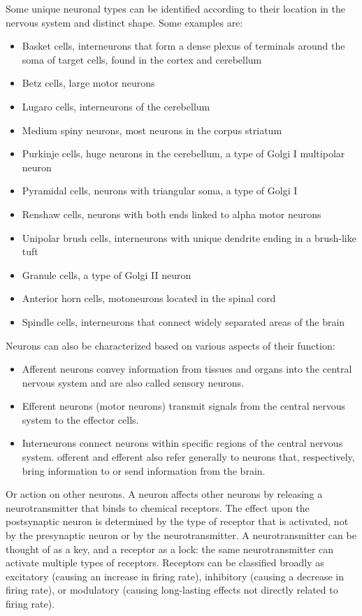 Some unique neuronal types can be identified according to their location in the nervous system and distinct shape. Some examples are:

\begin{itemize}
\tightlist
\item
  Basket cells, interneurons that form a dense plexus of terminals around the soma of target cells, found in the cortex and cerebellum
\item
  Betz cells, large motor neurons
\item
  Lugaro cells, interneurons of the cerebellum
\item
  Medium spiny neurons, most neurons in the corpus striatum
\item
  Purkinje cells, huge neurons in the cerebellum, a type of Golgi I multipolar neuron
\item
  Pyramidal cells, neurons with triangular soma, a type of Golgi I
\item
  Renshaw cells, neurons with both ends linked to alpha motor neurons
\item
  Unipolar brush cells, interneurons with unique dendrite ending in a brush-like tuft
\item
  Granule cells, a type of Golgi II neuron
\item
  Anterior horn cells, motoneurons located in the spinal cord
\item
  Spindle cells, interneurons that connect widely separated areas of the brain
\end{itemize}

Neurons can also be characterized based on various aspects of their function:

\begin{itemize}
\tightlist
\item
  Afferent neurons convey information from tissues and organs into the central nervous system and are also called sensory neurons.
\item
  Efferent neurons (motor neurons) transmit signals from the central nervous system to the effector cells.
\item
  Interneurons connect neurons within specific regions of the central nervous system.
  offerent and efferent also refer generally to neurons that, respectively, bring information to or send information from the brain.
\end{itemize}

Or action on other neurons. A neuron affects other neurons by releasing a neurotransmitter that binds to chemical receptors. The effect upon the postsynaptic neuron is determined by the type of receptor that is activated, not by the presynaptic neuron or by the neurotransmitter. A neurotransmitter can be thought of as a key, and a receptor as a lock: the same neurotransmitter can activate multiple types of receptors. Receptors can be classified broadly as excitatory (causing an increase in firing rate), inhibitory (causing a decrease in firing rate), or modulatory (causing long-lasting effects not directly related to firing rate).

